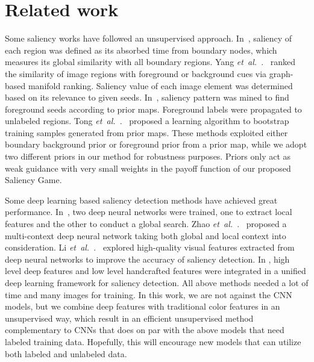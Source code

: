 \documentclass[journal]{IEEEtran}
\newcommand{\etal}{\mbox{\emph{et al.\ }}}
\begin{document}
\section{Related work}

Some saliency works have followed an unsupervised approach. In~\cite{Jiang2013Saliency}, saliency of each region was defined as its absorbed time from boundary nodes, which measures its global similarity with all boundary regions. 
Yang \etal.~\cite{yang2013saliency} ranked the similarity of image regions with foreground or background cues via graph-based manifold ranking. Saliency value of each image element was determined based on its relevance to given seeds. %
In~\cite{Kong2016Pattern}, saliency pattern was mined to find foreground seeds according to prior maps. Foreground labels were propagated to unlabeled regions. Tong \etal.~\cite{tong2015bootstrap} proposed a learning algorithm to bootstrap training samples generated from prior maps. These methods exploited either boundary background prior or foreground prior from a prior map, while we adopt two different priors in our method for robustness purposes. Priors only act as weak guidance with very small weights in the payoff function of our proposed Saliency Game. 

Some deep learning based saliency detection methods have achieved great performance. In~\cite{Wang2015Deep}, two deep neural networks were trained, one to extract local features and the other to conduct a global search. Zhao \etal.~\cite{zhao2015saliency} proposed a multi-context deep neural network taking both global and local context into consideration. Li \etal.~\cite{Li2015Visual} explored high-quality visual features extracted from deep neural networks to improve the accuracy of saliency detection. In \cite{Lee_2016_CVPR}, high level deep features and low level handcrafted features were integrated in a unified deep learning framework for saliency detection. All above methods needed a lot of time and many images for training. In this work, we are not against the CNN models, but we combine deep features with traditional color features in an unsupervised way, which result in an efficient unsupervised method complementary to CNNs that does on par with the above models that need labeled training data. Hopefully, this will encourage new models that can utilize both labeled and unlabeled data. 
\end{document}
